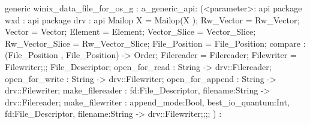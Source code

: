 generic winix_data_file_for_os_g
:
a_generic_api:
(<parameter>:
api {   package wxd
          : api {   package drv
                      : api {
                            Mailop X = Mailop(X );
                            Rw_Vector  = Rw_Vector;
                            Vector  = Vector;
                            Element  = Element;
                            Vector_Slice  = Vector_Slice;
                            Rw_Vector_Slice  = Rw_Vector_Slice;
                            File_Position  = File_Position;
                            compare : (File_Position , File_Position) -> Order;
                            Filereader = Filereader;
                            Filewriter = Filewriter;};;
                File_Descriptor;
                open_for_read : String -> drv::Filereader;
                open_for_write : String -> drv::Filewriter;
                open_for_append : String -> drv::Filewriter;
                make_filereader : {fd:File_Descriptor, filename:String} -> drv::Filereader;
                    make_filewriter :
                    {append_mode:Bool, best_io_quantum:Int, fd:File_Descriptor, filename:String} -> drv::Filewriter;};;};
)
:
